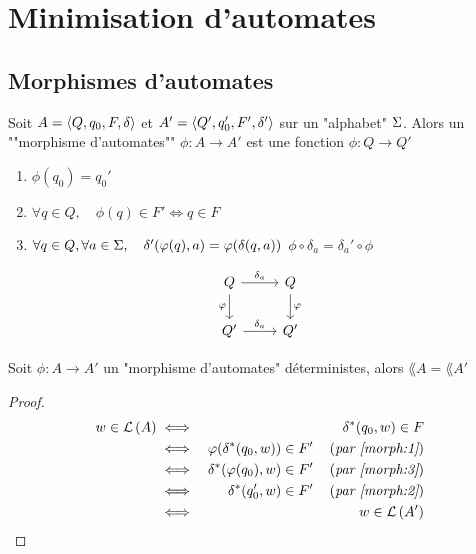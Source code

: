 \section{Minimisation d'automates}

\subsection{Morphismes d'automates}

\begin{definition}
	Soit $A = \langle Q, q_0, F, \delta \rangle$ et $ A' = \langle Q', q_0', F', \delta' \rangle $ sur un "alphabet" $\Sigma$.
	Alors un ""morphisme d'automates"" $\phi: A \to A'$ est une fonction $\phi: Q \to Q'$ \tlq
	\begin{enumerate}
		\item $\phi (q_0) = q_0'$ \label{morph:1}
		\item $\forall q \in Q,\quad  \phi (q) \in F' \iff q \in F$ \label{morph:2}
		\item $\forall q \in Q, \forall a \in \Sigma,\quad \delta'(\varphi (q), a) = \varphi (\delta(q,a))$ \ie $\phi \circ \delta_a = \delta_a '\circ \phi$ \label{morph:3}
	\end{enumerate}

	\[
		\begin{tikzcd}
			Q \arrow{r}{\delta_a} \arrow[swap]{d}{\phi} & Q \arrow{d}{\phi} \\
			Q' \arrow{r}{\delta_a} & Q'
		\end{tikzcd}
	\]

\end{definition}


\begin{exercice}
	Soit $\phi : A \to A'$ un "morphisme d'automates" déterministes, alors $\lang A = \lang {A'}$
\end{exercice}

\begin{proof}
	\begin{eqnarray*}
		w \in \mathcal{L}\left(A\right) &\iff& \delta^{*} (q_0, w) \in F \\
		&\iff& \varphi (\delta^{*} (q_0, w)) \in F' \quad\left(\textit{par \ref{morph:1}}\right)\\
		&\iff& \delta^{*}( \varphi (q_0), w) \in F' \quad\left(\textit{par \ref{morph:3}}\right)\\
		&\iff& \delta^{*}( q_0', w) \in F' \quad\left(\textit{par \ref{morph:2}}\right)\\
		&\iff& w \in \mathcal{L}\left(A'\right)
	\end{eqnarray*}
\end{proof}


